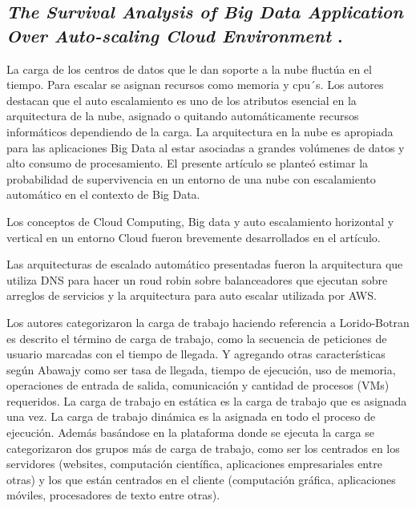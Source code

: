 \subsection{
    \textbf{\emph{The Survival Analysis of Big Data Application
            Over Auto-scaling Cloud Environment}
    }
    \cite[pág. 155]{somani_emerging_2019}.
}

La carga de los centros de datos que le dan soporte a la nube fluctúa en el tiempo.
Para escalar se asignan recursos como memoria y cpu´s.
Los autores destacan que el auto escalamiento es uno de los atributos esencial en la arquitectura de la nube, asignado o quitando automáticamente recursos informáticos dependiendo de la carga.
La arquitectura en la nube es apropiada para las aplicaciones Big Data al estar asociadas a grandes volúmenes de datos y alto consumo de procesamiento.
El presente artículo se planteó estimar la probabilidad de supervivencia
en un entorno de una nube con escalamiento automático en el contexto de Big Data.
\par

Los conceptos de Cloud Computing, Big data y auto escalamiento horizontal y vertical en un entorno Cloud fueron brevemente desarrollados en el artículo.
\par

Las arquitecturas de escalado automático presentadas fueron la arquitectura que utiliza DNS para hacer un roud robin sobre balanceadores que ejecutan sobre arreglos de servicios y la arquitectura para auto escalar utilizada por AWS.
\par


Los autores categorizaron la carga de trabajo
haciendo referencia a Lorido-Botran es descrito el término de carga de trabajo,
como la secuencia de peticiones de usuario marcadas con el tiempo de llegada. Y agregando otras características según Abawajy como ser tasa de llegada, tiempo de ejecución, uso de memoria, operaciones de entrada de salida, comunicación y cantidad de procesos (VMs) requeridos. La carga de trabajo en estática
es la carga de trabajo que es asignada una vez. La carga de trabajo dinámica es la asignada en todo el proceso de ejecución.
Además basándose en la plataforma donde se ejecuta la carga se categorizaron dos grupos más de carga de trabajo, como ser los centrados en los servidores (websites, computación científica, aplicaciones empresariales entre otras) y los que están centrados en el cliente (computación gráfica, aplicaciones móviles, procesadores de texto entre otras).
\par


